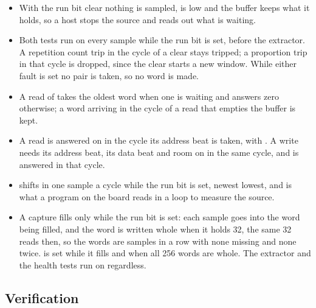 \begin{itemize}
\item With the run bit clear nothing is sampled,  is low and
the buffer keeps what it holds, so a host stops the source and reads
out what is waiting.
\item Both tests run on every sample while the run bit is set, before
the extractor. A repetition count trip in the cycle of a clear stays
tripped; a proportion trip in that cycle is dropped, since the clear
starts a new window. While either fault is set no pair is taken, so no
word is made.
\item A read of  takes the oldest word when one is waiting
and answers zero otherwise; a word arriving in the cycle of a read
that empties the buffer is kept.
\item A read is answered on  in the cycle its address
beat is taken, with . A write needs its address beat, its
data beat and room on  in the same cycle, and is answered
 in that cycle.
\item {} shifts in one sample a cycle while the run
bit is set, newest lowest, and is what a program on the board reads
in a loop to measure the source.
\item A capture fills only while the run bit is set: each sample goes
into the word being filled, and the word is written whole when it
holds 32, the same 32  reads then, so the words are samples
in a row with none missing and none twice.  is set while it
fills and  when all 256 words are whole. The extractor and
the health tests run on regardless.
\end{itemize}

\subsection*{Verification}

